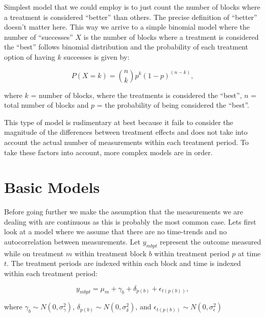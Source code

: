\documentclass[12pt,a4paper,leqno]{report}
\theoremstyle{plain}
\theoremstyle{definition}
\theoremstyle{remark}
\begin{document}
Simplest model that we could employ is to just count the number of blocks where
a treatment is considered ``better'' than others. The precise definition of
``better'' doesn't matter here. This way we arrive to a simple binomial model
where the number of ``successes'' \(X\) is the number of blocks where a
treatment is considered the ``best'' follows binomial distribution and the
probability of each treatment option of having \(k\) successes is given by:

\begin{def}\label{}
    \begin{equation}
        P(X = k) = {n\choose k}p^k{(1-p)}^{(n-k)},
    \end{equation}
\end{def}where \(k\) = number of blocks, where the treatments is considered the
``best'', \(n\) = total number of blocks and \(p\) = the probability of being
considered the ``best''.

This type of model is rudimentary at best because it fails to consider the
magnitude of the differences between treatment effects and does not take into
account the actual number of measurements within each treatment period. To take
these factors into account, more complex models are in order.

\section{Basic Models}\label{conti}

Before going further we make the assumption that the measurements we are dealing with are continuous
as this is probably the most common case. Lets first look at a model where
we assume that there are no time-trends and no autocorrelation between
measurements. Let \(y_{mbpt}\) represent the outcome measured while on treatment
\(m\) within treatment block \(b\) within treatment period \(p\) at time \(t\).
The treatment periods are indexed within each block and time is indexed within
each treatment period:

\begin{def}\label{}
    \begin{equation}\label{allerrors}
        y_{mbpt} = \mu_m + \gamma_b + \delta_{p(b)} + \epsilon_{t(p(b))},
    \end{equation}
\end{def}where \(\gamma_b \sim N(0,\sigma^2_{\gamma})\), \(\delta_{p(b)} \sim
N(0,\sigma^2_{\delta})\), and \(\epsilon_{t(p(b))} \sim
N(0,\sigma^2_{\epsilon})\)
\end{document}
